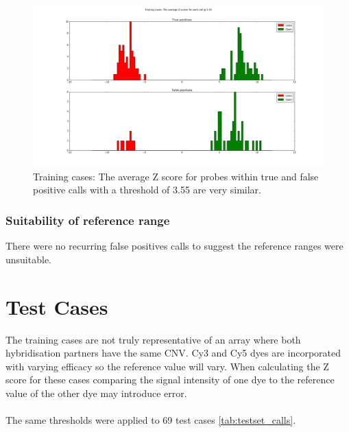 \begin{figure}[h]
\centering
\includegraphics[width=1\linewidth]{./Figures/average_3_55}
\caption[Training cases:Average Z scores for calls made with a threshold of 3.55]{Training cases: The average Z score for probes within true and false positive calls with a threshold of 3.55 are very similar.}
\label{fig:average_3_55}
\end{figure}

\subsubsection{Suitability of reference range}
There were no recurring false positives calls to suggest the reference ranges were unsuitable.

\section{Test Cases}
The training cases are not truly representative of an array where both hybridisation partners have the same CNV. Cy3 and Cy5 dyes are incorporated with varying efficacy so the reference value will vary. When calculating the Z score for these cases comparing the signal intensity of one dye to the reference value of the other dye may introduce error.
\paragraph*{}
The same thresholds were applied to 69 test cases \ref{tab:testset_calls}. 

